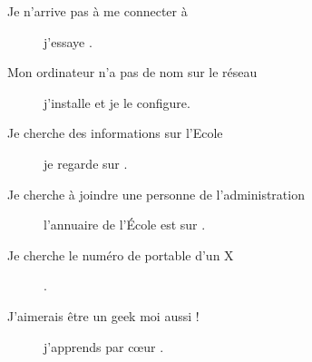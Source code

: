 \begin{description}
\item[Je n'arrive pas à me connecter à ] j'essaye .

\item[Mon ordinateur n'a pas de nom sur le réseau] j'installe  et je le configure.

\item[Je cherche des informations sur l'Ecole] je regarde sur .

\item[Je cherche à joindre une personne de l'administration] l'annuaire de l'École est sur \linebreak{} .

\item[Je cherche le numéro de portable d'un X] .

\item[J'aimerais être un geek moi aussi !] j'apprends par c\oe ur .

\end{description}
